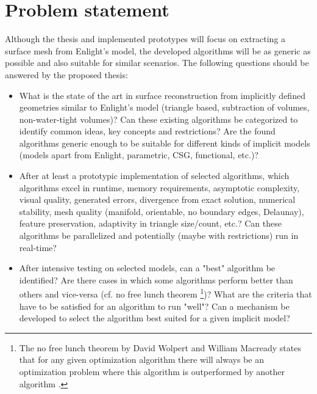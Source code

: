 
\section{Problem statement}

Although the thesis and implemented prototypes will focus on extracting a surface mesh from Enlight's model, the developed algorithms will be as generic as possible and also suitable for similar scenarios.
The following questions should be answered by the proposed thesis:

\begin{itemize}
	\item What is the state of the art in surface reconstruction from implicitly defined geometries similar to Enlight's model (triangle based, subtraction of volumes, non-water-tight volumes)? Can these existing algorithms be categorized to identify common ideas, key concepts and restrictions? Are the found algorithms generic enough to be suitable for different kinds of implicit models (models apart from Enlight, parametric, CSG, functional, etc.)?
	
	\item After at least a prototypic implementation of selected algorithms, which algorithms excel in runtime, memory requirements, asymptotic complexity, visual quality, generated errors, divergence from exact solution, numerical stability, mesh quality (manifold, orientable, no boundary edges, Delaunay), feature preservation, adaptivity in triangle size/count, etc.? Can these algorithms be parallelized and potentially (maybe with restrictions) run in real-time?
	
	\item After intensive testing on selected models, can a "best" algorithm be identified? Are there cases in which some algorithms perform better than others and vice-versa (cf. no free lunch theorem \footnote{The no free lunch theorem by David Wolpert and William Macready states that for any given optimization algorithm there will always be an optimization problem where this algorithm is outperformed by another algorithm \cite{no_free_lunch}. })? What are the criteria that have to be satisfied for an algorithm to run "well"? Can a mechanism be developed to select the algorithm best suited for a given implicit model?
\end{itemize}
